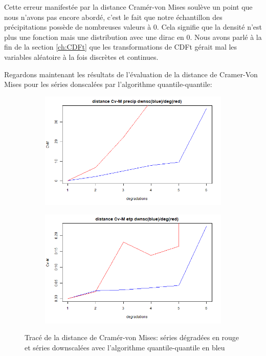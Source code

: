 \documentclass[a4paper,11pt]{article}
\numberwithin{equation}{section}
\begin{document}
Cette erreur manifestée par la distance Cramér-von Mises soulève un point que nous n'avons pas encore abordé, c'est le fait que notre échantillon des précipitations possède de nombreuses valeurs à $0$. Cela signifie que la densité n'est plus une fonction mais une distribution avec une dirac en $0$. Nous avons parlé à la fin de la section \ref{ch:CDFt} que les transformations de CDFt gérait mal les variables aléatoire à la fois discrètes et continues.

Regardons maintenant les résultats de l'évaluation de la distance de Cramer-Von Mises pour les séries donscalées par l'algorithme quantile-quantile:

\begin{figure}[H]
 	\label{fig-res_CVM_QQ}
 	\centering
 	\begin{subfigure}[b]{0.45\textwidth}
 		\includegraphics[scale=0.4]{images/Dist_CVM_precip_QQ.png}
 	\end{subfigure}
	\hfill
	\begin{subfigure}[b]{0.45\textwidth}
		\includegraphics[scale=0.4]{images/Dist_CVM_evap_QQ.png}
	\end{subfigure}
 	\caption{Tracé de la distance de Cramér-von Mises: séries dégradées en rouge et séries downscalées avec l'algorithme quantile-quantile en bleu}
\end{figure}
\end{document}
